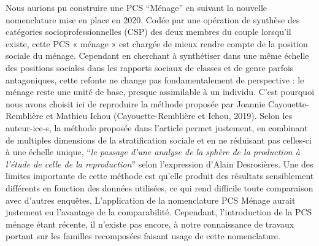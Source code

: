 \documentclass[
  12pt,
]{book}
\begin{document}
Nous aurions pu construire une PCS ``Ménage'' en suivant la nouvelle
nomenclature mise en place en 2020. Codée par une opération de synthèse
des catégories socioprofessionnelles (CSP) des deux membres du couple
lorsqu'il existe, cette PCS « ménage » est chargée de mieux rendre
compte de la position sociale du ménage. Cependant en cherchant à
synthétiser dans une même échelle des positions sociales dans les
rapports sociaux de classes et de genre parfois antagoniques, cette
refonte ne change pas fondamentalement de perspective : le ménage reste
une unité de base, presque assimilable à un individu. C'est pourquoi
nous avons choisit ici de reproduire la méthode proposée par Joannie
Cayouette-Remblière et Mathieu Ichou (Cayouette-Remblière et Ichou,
2019). Selon les auteur-ice-s, la méthode proposée dans l'article permet
justement, en combinant de multiples dimensions de la stratification
sociale et en ne réduisant pas celles-ci à une échelle unique,
``\emph{le passage d'une analyse de la sphère de la production à l'étude
de celle de la reproduction}'' selon l'expression d'Alain Desrosières.
Une des limites importante de cette méthode est qu'elle produit des
résultats sensiblement différents en fonction des données utilisées, ce
qui rend difficile toute comparaison avec d'autres enquêtes.
L'application de la nomenclature PCS Ménage aurait justement eu
l'avantage de la comparabilité. Cependant, l'introduction de la PCS
ménage étant récente, il n'existe pas encore, à notre connaissance de
travaux portant sur les familles recomposées faisant usage de cette
nomenclature.
\end{document}
